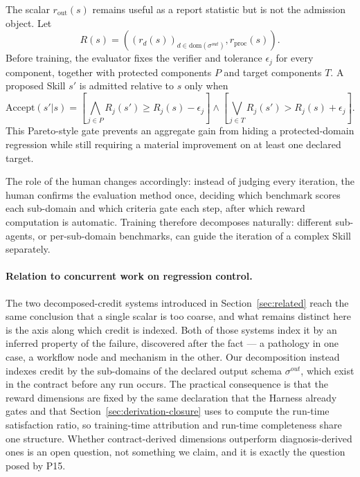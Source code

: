 The scalar $r_{\mathrm{out}}(s)$ remains useful as a report statistic but is not the admission object. Let
\begin{equation}
R(s)=\left(\left(r_d(s)\right)_{d\in\mathrm{dom}(\sigma^{out})},r_{\mathrm{proc}}(s)\right).
\end{equation}
Before training, the evaluator fixes the verifier and tolerance $\epsilon_j$ for every component, together with protected components $P$ and target components $T$. A proposed Skill $s'$ is admitted relative to $s$ only when
\begin{equation}
\mathrm{Accept}(s'|s)=
\left[\bigwedge_{j\in P}R_j(s')\geq R_j(s)-\epsilon_j\right]
\land
\left[\bigvee_{j\in T}R_j(s')>R_j(s)+\epsilon_j\right].
\end{equation}
This Pareto-style gate prevents an aggregate gain from hiding a protected-domain regression while still requiring a material improvement on at least one declared target.

The role of the human changes accordingly: instead of judging every iteration, the human confirms the evaluation method once, deciding which benchmark scores each sub-domain and which criteria gate each step, after which reward computation is automatic. Training therefore decomposes naturally: different sub-agents, or per-sub-domain benchmarks, can guide the iteration of a complex Skill separately.

\paragraph{Relation to concurrent work on regression control.}
The two decomposed-credit systems introduced in Section~\ref{sec:related} \cite{luo2026gsme,lin2026wml} reach the same conclusion that a single scalar is too coarse, and what remains distinct here is the axis along which credit is indexed. Both of those systems index it by an inferred property of the failure, discovered after the fact --- a pathology in one case, a workflow node and mechanism in the other. Our decomposition instead indexes credit by the sub-domains of the declared output schema $\sigma^{out}$, which exist in the contract before any run occurs. The practical consequence is that the reward dimensions are fixed by the same declaration that the Harness already gates and that Section~\ref{sec:derivation-closure} uses to compute the run-time satisfaction ratio, so training-time attribution and run-time completeness share one structure. Whether contract-derived dimensions outperform diagnosis-derived ones is an open question, not something we claim, and it is exactly the question posed by P15.


